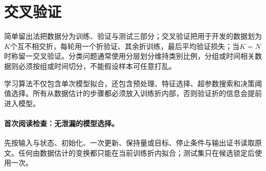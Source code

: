 \documentclass[UTF8,a4paper,11pt,openany]{ctexbook}
\begin{document}
\setcounter{page}{184}
\setcounter{chapter}{10}
\pagestyle{headings}
\section*{交叉验证}
简单留出法把数据分为训练、验证与测试三部分；\kFold{}交叉验证把用于开发的数据划为$K$个互不相交折，每轮用一个折验证、其余折训练，最后平均验证损失；当$K=N$时称留一交叉验证。分类问题通常使用分层划分维持类别比例，分组或时间相关数据则必须按组或时间切分，不能假设样本可任意打乱。

学习算法不仅包含单次模型拟合，还包含预处理、特征选择、超参数搜索和决策阈值选择。所有从数据估计的步骤都必须放入训练折内部，否则验证折的信息会提前进入模型。



\paragraph{首次阅读检查：无泄漏的模型选择。}先按输入与状态、初始化、一次更新、保持量或目标、停止条件与输出证书读取原文。任何由数据估计的变换都只能在当前训练折内拟合；测试集只在候选锁定后使用一次。
\end{document}
